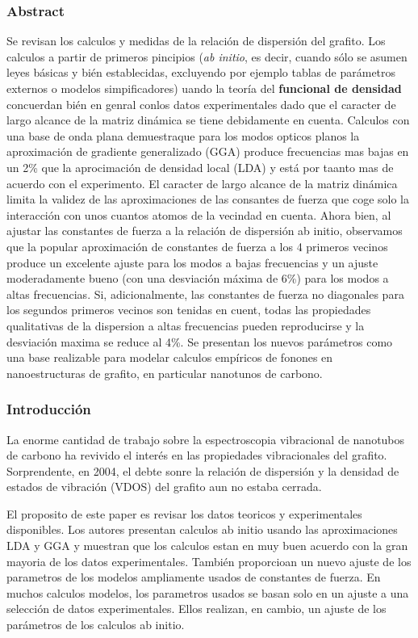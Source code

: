 \documentclass[11pt]{article}
\begin{document}
\subsubsection{Abstract}
\label{sec:orgb6153d2}
Se revisan los calculos y medidas de la relación de dispersión del grafito. Los calculos a partir de  primeros pincipios (\emph{ab initio}, es decir, cuando sólo se asumen leyes básicas y bién establecidas, excluyendo por ejemplo tablas de parámetros externos o modelos simpificadores) uando la teoría del \textbf{funcional de densidad} concuerdan bién en genral conlos datos experimentales dado que el caracter de largo alcance de la matriz dinámica se tiene debidamente en cuenta. Calculos con una base de onda plana demuestraque para los modos opticos planos la aproximación de gradiente generalizado (GGA) produce frecuencias mas bajas en un 2\% que la aprocimación de densidad local (LDA) y está por taanto mas de acuerdo con el experimento. El caracter de largo alcance de la matriz dinámica limita la validez de las aproximaciones de las consantes de fuerza que coge solo la interacción con unos cuantos atomos de la vecindad en cuenta. Ahora bien, al ajustar las constantes de fuerza a la relación de dispersión ab initio, observamos que la popular aproximación de constantes de fuerza a los 4 primeros vecinos produce un excelente ajuste para los modos a bajas frecuencias y un ajuste moderadamente bueno (con una desviación máxima de 6\%) para los modos a altas frecuencias. Si, adicionalmente, las constantes de fuerza no diagonales para los segundos primeros vecinos son tenidas en cuent, todas las propiedades qualitativas de la dispersion a altas frecuencias pueden reproducirse y la desviación maxima se reduce al 4\%. Se presentan los nuevos parámetros como una base realizable para modelar calculos empíricos de fonones en nanoestructuras de grafito, en particular nanotunos de carbono. 
\subsubsection{Introducción}
\label{sec:orgf6f5ab8}
La enorme cantidad de trabajo sobre la espectroscopia vibracional de nanotubos de carbono ha revivido el interés en las propiedades vibracionales del grafito. Sorprendente, en 2004, el debte sonre la relación de dispersión y la densidad de estados de vibración (VDOS) del grafito aun no estaba cerrada.

El proposito de este paper es revisar los datos teoricos y experimentales disponibles. Los autores presentan calculos ab initio usando las aproximaciones LDA y GGA y muestran que los calculos estan en muy buen acuerdo con la gran mayoria de los datos experimentales. También proporcioan un nuevo ajuste de los parametros de los modelos ampliamente usados de constantes de fuerza. En muchos calculos modelos, los parametros usados se basan solo en un ajuste a una selección de datos experimentales. Ellos realizan, en cambio, un ajuste de los parámetros de los calculos ab initio.
\end{document}
